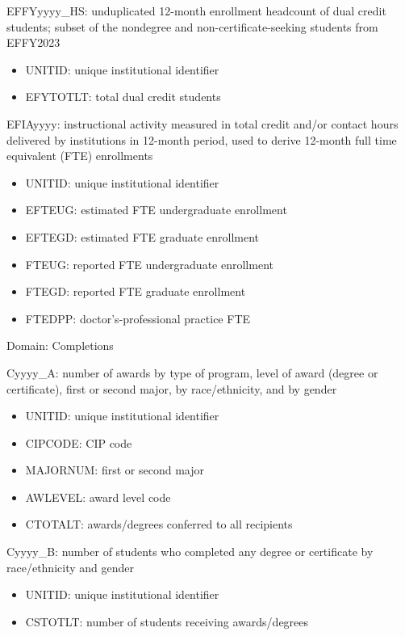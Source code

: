 \documentclass[sigconf, authorversion, nonacm]{acmart}
\begin{document}
    EFFYyyyy\_HS: unduplicated 12-month enrollment headcount of dual credit students; subset of the nondegree and non-certificate-seeking students from EFFY2023

    \begin{itemize}
        \item UNITID: unique institutional identifier
        \item EFYTOTLT: total dual credit students
    \end{itemize}

    EFIAyyyy: instructional activity measured in total credit and/or contact hours delivered by institutions in 12-month period, used to derive 12-month full time equivalent (FTE) enrollments

    \begin{itemize}
        \item UNITID: unique institutional identifier
        \item EFTEUG: estimated FTE undergraduate enrollment
        \item EFTEGD: estimated FTE graduate enrollment
        \item FTEUG: reported FTE undergraduate enrollment
        \item FTEGD: reported FTE graduate enrollment
        \item FTEDPP: doctor's-professional practice FTE
    \end{itemize}

    Domain: Completions

    Cyyyy\_A: number of awards by type of program, level of award (degree or certificate), first or second major, by race/ethnicity, and by gender

    \begin{itemize}
        \item UNITID: unique institutional identifier
        \item CIPCODE: CIP code
        \item MAJORNUM: first or second major
        \item AWLEVEL: award level code
        \item CTOTALT: awards/degrees conferred to all recipients
    \end{itemize}

    Cyyyy\_B: number of students who completed any degree or certificate by race/ethnicity and gender

    \begin{itemize}
        \item UNITID: unique institutional identifier
        \item CSTOTLT: number of students receiving awards/degrees
    \end{itemize}
\end{document}
